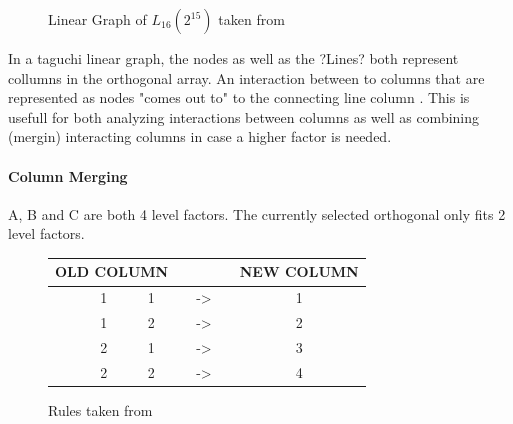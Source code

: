 \begin{figure}[H]
	\centering
{}
\caption{ Linear Graph of $L_{16}(2^{15})$ taken from \cite{yang_design_2009}}
\end{figure}


In a taguchi linear graph, the nodes as well as the ?Lines? both represent collumns in the orthogonal array. An interaction between to columns that are represented as nodes "comes out to" to the connecting line column \cite{taguchi_taguchis_2005}. This is usefull for both analyzing interactions between columns as well as combining (mergin) interacting columns in case a higher factor is needed.

\paragraph{Column Merging}
A, B and C are both 4 level factors. The currently selected orthogonal only fits 2 level factors. 


\begin{figure}[H]
	\centering
	\begin{tabular}{ |ccccccc|  }
		\hline
		\multicolumn{3}{|c}{ OLD COLUMN } & & & & NEW COLUMN \\
		\hline
		& 1 & 1 & & -> & & 1\\
		& 1 & 2 & & -> & & 2\\
		& 2 & 1 & & -> & & 3\\
		& 2 & 2 & & -> & & 4\\
		\hline
	\end{tabular}
	\caption{Rules taken from \cite{roy_primer_1990}}
	\label{table:hyperparameter_tuning:merging_rules}
\end{figure}

